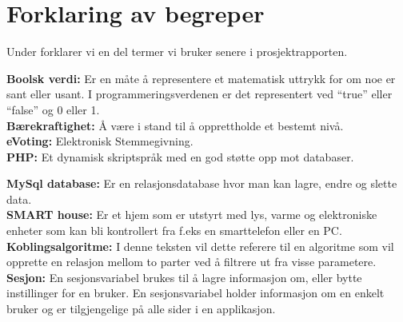 \section*{Forklaring av begreper}

Under forklarer vi en del termer vi bruker senere i prosjektrapporten.

{\bf Boolsk verdi:} Er en måte å representere et matematisk uttrykk for om noe er sant eller usant. I programmeringsverdenen er det representert ved ``true'' eller ``false'' og 0 eller 1.\citep{website:wiki_boolean}\\

{\bf Bærekraftighet:} Å være i stand til å opprettholde et bestemt nivå.\citep{website:sustainable}\\

{\bf eVoting:} Elektronisk Stemmegivning. \citep{website:wiki_evoting}\\

{\bf PHP:} Et dynamisk skriptspråk med en god støtte opp mot databaser.\citep{website:wiki_PHP}

{\bf MySql database:} Er en relasjonsdatabase hvor man kan lagre, endre og slette data. \citep{website:glossary}\\

{\bf SMART house:} Er et hjem som er utstyrt med lys, varme og elektroniske enheter som kan bli kontrollert fra f.eks en smarttelefon eller en PC. \citep{website:smarthome}\\

{\bf Koblingsalgoritme:}  I denne teksten vil dette referere til en algoritme som vil opprette en relasjon mellom to parter ved å filtrere ut fra visse parametere.\\

{\bf Sesjon:} En sesjonsvariabel brukes til å lagre informasjon om, eller bytte instillinger for en bruker. En sesjonsvariabel holder informasjon om en enkelt bruker og er tilgjengelige på alle sider i en applikasjon.\citep{website:sessionvariable}

